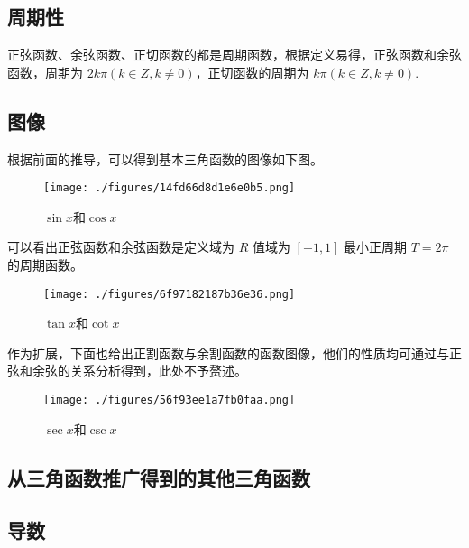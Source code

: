 \subsection{周期性}

正弦函数、余弦函数、正切函数的都是周期函数，根据定义易得，正弦函数和余弦函数，周期为 $2k\pi(k\in Z,k\neq0)$，正切函数的周期为 $k\pi(k\in Z,k\neq0)$.


\subsection{图像}
根据前面的推导，可以得到基本三角函数的图像如下图。
\begin{figure}[ht]
\centering
\texttt{[image: ./figures/14fd66d8d1e6e0b5.png]}
\caption{$\sin x$和$\cos x$} \label{fig_HsTFFv_1}
\end{figure}
可以看出正弦函数和余弦函数是定义域为 $R$ 值域为 $[-1,1]$ 最小正周期 $T = 2\pi$ 的周期函数。

\begin{figure}[ht]
\centering
\texttt{[image: ./figures/6f97182187b36e36.png]}
\caption{$\tan x$和$\cot x$} \label{fig_HsTFFv_3}
\end{figure}

作为扩展，下面也给出正割函数与余割函数的函数图像，他们的性质均可通过与正弦和余弦的关系分析得到，此处不予赘述。

\begin{figure}[ht]
\centering
\texttt{[image: ./figures/56f93ee1a7fb0faa.png]}
\caption{$\sec x$和$\csc x$} \label{fig_HsTFFv_2}
\end{figure}

\subsection{从三角函数推广得到的其他三角函数}

\subsection{导数}